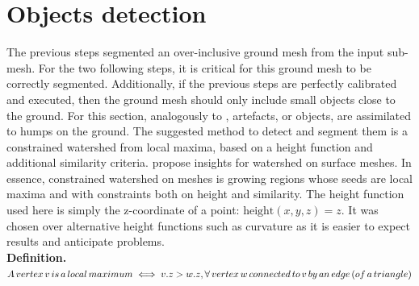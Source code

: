 \documentclass{kththesis}
\begin{document}
\section{Objects detection}
The previous steps segmented an over-inclusive ground mesh from the input sub-mesh. For the two following steps, it is critical for this ground mesh to be correctly segmented. Additionally, if the previous steps are perfectly calibrated and executed, then the ground mesh should only include small objects close to the ground. 
For this section, analogously to \textcite{HernandezArtefacts}, artefacts, or objects, are assimilated to humps on the ground. The suggested method to detect and segment them is a constrained watershed from local maxima, based on a height function and additional similarity criteria. \textcite{ManganMeshWatershed} propose insights for watershed on surface meshes. In essence,  constrained watershed on meshes is growing regions whose seeds  are local maxima and with constraints both on height and similarity. The height function used here is simply the z-coordinate of a point: $\text{height}(x,y,z) = z$. It was chosen over alternative height functions such as curvature as it is easier to expect results and anticipate problems.   \\

\textbf{Definition. }$ A \, vertex\, v\, is\, a\, local \,maximum \\\iff v.z > w.z, \forall \, vertex\, w \,connected \,to\, v \,by \,an\, edge \,(of \,a\,triangle)$ \\
\end{document}
